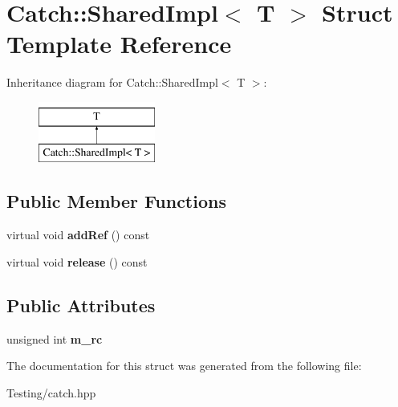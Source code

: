 \hypertarget{struct_catch_1_1_shared_impl}{\section{Catch\-:\-:Shared\-Impl$<$ T $>$ Struct Template Reference}
\label{struct_catch_1_1_shared_impl}
}
Inheritance diagram for Catch\-:\-:Shared\-Impl$<$ T $>$\-:\begin{figure}[H]
\begin{center}
\leavevmode
\includegraphics[height=2.000000cm]{struct_catch_1_1_shared_impl}
\end{center}
\end{figure}
\subsection*{Public Member Functions}
\begin{DoxyCompactItemize}
\item 
\hypertarget{struct_catch_1_1_shared_impl_a9b190b7a139a09d2624d1201d8e4f87e}{virtual void {\bfseries add\-Ref} () const }\label{struct_catch_1_1_shared_impl_a9b190b7a139a09d2624d1201d8e4f87e}

\item 
\hypertarget{struct_catch_1_1_shared_impl_a16baad80ad5ad3dfaf2a10a157a02e01}{virtual void {\bfseries release} () const }\label{struct_catch_1_1_shared_impl_a16baad80ad5ad3dfaf2a10a157a02e01}

\end{DoxyCompactItemize}
\subsection*{Public Attributes}
\begin{DoxyCompactItemize}
\item 
\hypertarget{struct_catch_1_1_shared_impl_a7e71ef1985b85aa41a1632f932a96bcb}{unsigned int {\bfseries m\-\_\-rc}}\label{struct_catch_1_1_shared_impl_a7e71ef1985b85aa41a1632f932a96bcb}

\end{DoxyCompactItemize}


The documentation for this struct was generated from the following file\-:\begin{DoxyCompactItemize}
\item 
Testing/catch.\-hpp\end{DoxyCompactItemize}
